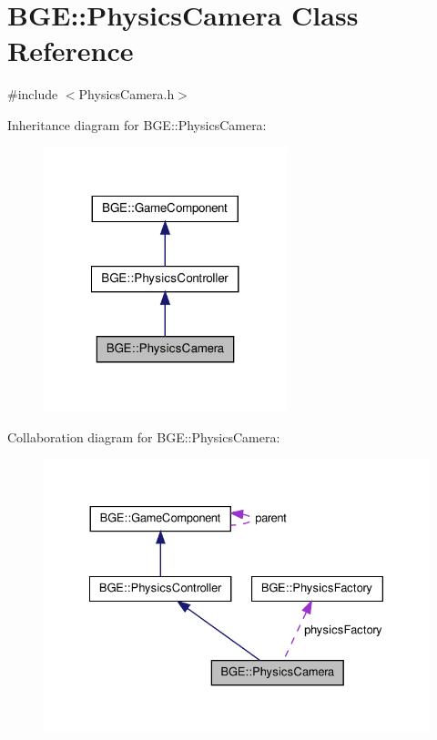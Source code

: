 \hypertarget{class_b_g_e_1_1_physics_camera}{\section{B\-G\-E\-:\-:Physics\-Camera Class Reference}
\label{class_b_g_e_1_1_physics_camera}
}


{\ttfamily \#include $<$Physics\-Camera.\-h$>$}



Inheritance diagram for B\-G\-E\-:\-:Physics\-Camera\-:
\nopagebreak
\begin{figure}[H]
\begin{center}
\leavevmode
\includegraphics[width=200pt]{class_b_g_e_1_1_physics_camera__inherit__graph}
\end{center}
\end{figure}


Collaboration diagram for B\-G\-E\-:\-:Physics\-Camera\-:
\nopagebreak
\begin{figure}[H]
\begin{center}
\leavevmode
\includegraphics[width=330pt]{class_b_g_e_1_1_physics_camera__coll__graph}
\end{center}
\end{figure}
